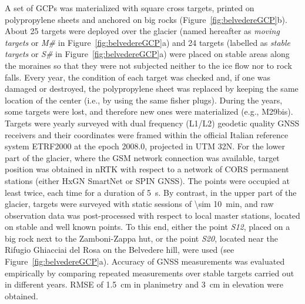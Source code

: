 A set of GCPs was materialized with square cross targets, printed on polypropylene sheets and anchored on big rocks (Figure~\ref{fig:belvedereGCP}b). 
About 25 targets were deployed over the glacier (named hereafter as \textit{moving targets} or \textit{M\#} in Figure~\ref{fig:belvedereGCP}a) and 24 targets (labelled as \textit{stable targets} or \textit{S\#} in Figure~\ref{fig:belvedereGCP}a) were placed on stable areas along the moraines so that they were not subjected neither to the ice flow nor to rock falls. 
Every year, the condition of each target was checked and, if one was damaged or destroyed, the polypropylene sheet was replaced by keeping the same location of the center (i.e., by using the same fisher plugs).
During the years, some targets were lost, and therefore new ones were materialized (e.g., M29bis).
Targets were yearly surveyed with dual frequency (L1/L2) geodetic quality GNSS receivers and their coordinates were framed within the official Italian reference system ETRF2000 at the epoch 2008.0, projected in UTM 32N. 
For the lower part of the glacier, where the GSM network connection was available, target position was obtained in nRTK with respect to a network of CORS permanent stations (either HxGN SmartNet or SPIN GNSS). 
The points were occupied at least twice, each time for a duration of \qty{5}{\second}.
By contrast, in the upper part of the glacier, targets were surveyed with static sessions of \qty{\sim 10}{\minute}, and raw observation data was post-processed with respect to local master stations, located on stable and well known points. 
To this end, either the point \textit{S12}, placed on a big rock next to the Zamboni-Zappa hut, or the point \textit{S20}, located near the Rifugio Ghiacciai del Rosa on the Belvedere hill,  were used (see Figure~\ref{fig:belvedereGCP}a).
Accuracy of GNSS measurements was evaluated empirically by comparing repeated measurements over stable targets carried out in different years.
RMSE of \qty{1.5}{\centi\meter} in planimetry and \qty{3}{\centi\meter} in elevation were obtained.

